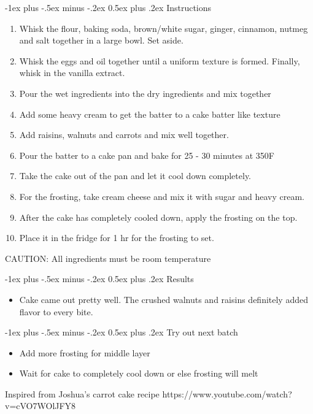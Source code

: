 \documentclass[10pt,landscape]{article}
\makeatletter
\renewcommand{\section}{\@startsection{section}{1}{0mm}%
                                {-1ex plus -.5ex minus -.2ex}%
                                {0.5ex plus .2ex}%
                                {\normalfont\large\bfseries}}
\makeatother
\begin{document}
\begin{multicols}{3}
\section{Instructions}
\begin{enumerate}
    \item Whisk the flour, baking soda, brown/white sugar, ginger, cinnamon, nutmeg and salt together in a large bowl. Set aside.
    \item Whisk the eggs and oil together until a uniform texture is formed. Finally, whisk in the vanilla extract.
    \item Pour the wet ingredients into the dry ingredients and mix together
    \item Add some heavy cream to get the batter to a cake batter like texture
    \item Add raisins, walnuts and carrots and mix well together.
    \item Pour the batter to a cake pan and bake for 25 - 30 minutes at 350\textdegree F
    \item Take the cake out of the pan and let it cool down completely.
    \item For the frosting, take cream cheese and mix it with sugar and heavy cream.
    \item After the cake has completely cooled down, apply the frosting on the top.
    \item Place it in the fridge for 1 hr for the frosting to set.
    
\end{enumerate}
\bigskip
CAUTION: All ingredients must be room temperature
\vfill\null
\columnbreak
 
\section{Results}
\begin{itemize}
    \item Cake came out pretty well. The crushed walnuts and raisins definitely added flavor to every bite. 

\end{itemize}
\bigskip
\section{Try out next batch}
\begin{itemize}
    \item Add more frosting for middle layer
    \item Wait for cake to completely cool down or else frosting will melt
\end{itemize}
\vfill\null
\columnbreak
\end{multicols}

\bigskip
Inspired from Joshua's carrot cake recipe https://www.youtube.com/watch?v=cVO7WOlJFY8
\end{document}
